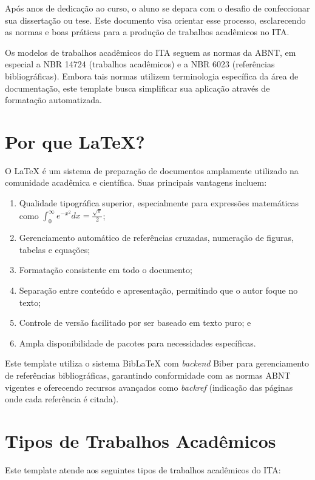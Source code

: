 Após anos de dedicação ao curso, o aluno se depara com o desafio de confeccionar sua dissertação ou tese. Este documento visa orientar esse processo, esclarecendo as normas e boas práticas para a produção de trabalhos acadêmicos no \ac{ITA}.

Os modelos de trabalhos acadêmicos do \ac{ITA} seguem as normas da \ac{ABNT}, em especial a NBR 14724 (trabalhos acadêmicos) e a NBR 6023 (referências bibliográficas). Embora tais normas utilizem terminologia específica da área de documentação, este template busca simplificar sua aplicação através de formatação automatizada.

\section{Por que \LaTeX?}

O \LaTeX{} é um sistema de preparação de documentos amplamente utilizado na comunidade acadêmica e científica. Suas principais vantagens incluem:

\begin{enumerate}
    \item Qualidade tipográfica superior, especialmente para expressões matemáticas como $\int_0^\infty e^{-x^2} dx = \frac{\sqrt{\pi}}{2}$;
    \item Gerenciamento automático de referências cruzadas, numeração de figuras, tabelas e equações;
    \item Formatação consistente em todo o documento;
    \item Separação entre conteúdo e apresentação, permitindo que o autor foque no texto;
    \item Controle de versão facilitado por ser baseado em texto puro; e
    \item Ampla disponibilidade de pacotes para necessidades específicas.
\end{enumerate}

Este template utiliza o sistema Bib\LaTeX{} com \textit{backend} Biber para gerenciamento de referências bibliográficas, garantindo conformidade com as normas ABNT vigentes e oferecendo recursos avançados como \textit{backref} (indicação das páginas onde cada referência é citada).

\section{Tipos de Trabalhos Acadêmicos}

Este template atende aos seguintes tipos de trabalhos acadêmicos do \ac{ITA}:


